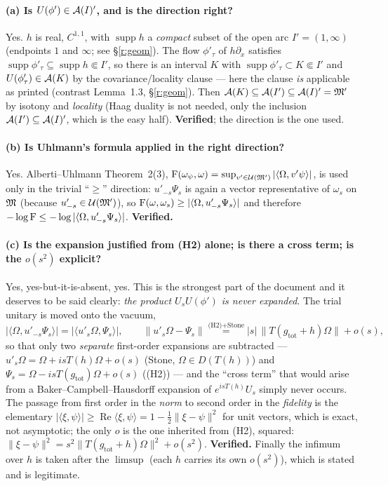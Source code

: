 \documentclass[11pt]{article}
\newcommand{\U}{\mathcal U}
\newcommand{\ip}[2]{\langle#1,#2\rangle}
\newcommand{\norm}[1]{\lVert#1\rVert}
\newcommand{\supp}{\operatorname{supp}}
\newcommand{\Om}{\Omega}
\newcommand{\gtot}{g_{\mathrm{tot}}}
\begin{document}
\paragraph{(a) Is $U(\phi')\in\mathcal A(I)'$, and is the direction right?}  Yes.  $h$ is real, $C^{1,1}$, with
$\supp h$ a \emph{compact} subset of the open arc $I'=(1,\infty)$ (endpoints $1$ and $\infty$; see
\S\ref{r:geom}).  The flow $\phi'_\tau$ of $h\partial_x$ satisfies
$\supp\phi'_\tau\subseteq\supp h\Subset I'$, so there is an interval $K$ with $\supp\phi'_\tau\subset K\Subset
I'$ and $U(\phi'_\tau)\in\mathcal A(K)$ by the covariance/locality clause --- here the clause \emph{is} applicable
as printed (contrast Lemma~1.3, \S\ref{r:geom}).  Then $\mathcal A(K)\subseteq\mathcal A(I')\subseteq\mathcal A(I)'=\mathfrak M'$ by
isotony and \emph{locality} (Haag duality is not needed, only the inclusion
$\mathcal A(I')\subseteq\mathcal A(I)'$, which is the easy half).  \textbf{Verified}; the direction is the one used.

\paragraph{(b) Is Uhlmann's formula applied in the right direction?}  Yes.  Alberti--Uhlmann Theorem~2(3),
$\Fid(\omega_\psi,\omega)=\sup_{v'\in\U(\cM')}|\ip\Om{v'\psi}|$, is used only in the trivial ``$\ge$''
direction: $u'_{-s}\Psi_s$ is again a vector representative of $\omega_s$ on $\mathfrak M$ (because
$u'_{-s}\in\U(\cM')$), so $\Fid(\omega,\omega_s)\ge|\ip\Om{u'_{-s}\Psi_s}|$ and therefore
$-\log\Fid\le-\log|\ip\Om{u'_{-s}\Psi_s}|$.  \textbf{Verified.}

\paragraph{(c) Is the expansion justified from (H2) alone; is there a cross term; is the $o(s^2)$ explicit?}
Yes, yes-but-it-is-absent, yes.  This is the strongest part of the document and it deserves to be said
clearly: \emph{the product $U_sU(\phi')$ is never expanded}.  The trial unitary is moved onto the vacuum,
\[
 \bigl|\ip\Om{u'_{-s}\Psi_s}\bigr|=\bigl|\ip{u'_s\Om}{\Psi_s}\bigr|,\qquad
 \norm{u'_s\Om-\Psi_s}\overset{\text{(H2)}+\text{Stone}}{=}|s|\,\norm{T(\gtot+h)\Om}+o(s),
\]
so that only two \emph{separate} first-order expansions are subtracted --- $u'_s\Om=\Om+isT(h)\Om+o(s)$
(Stone, $\Om\in D(T(h))$) and $\Psi_s=\Om-isT(\gtot)\Om+o(s)$ ((H2)) --- and the ``cross term'' that would
arise from a Baker--Campbell--Hausdorff expansion of $e^{isT(h)}U_s$ simply never occurs.  The passage from
first order in the \emph{norm} to second order in the \emph{fidelity} is the elementary
$|\ip\xi\psi|\ge\operatorname{Re}\ip\xi\psi=1-\frac12\norm{\xi-\psi}^2$ for unit vectors, which is exact,
not asymptotic; the only $o$ is the one inherited from (H2), squared:
$\norm{\xi-\psi}^2=s^2\norm{T(\gtot+h)\Om}^2+o(s^2)$.  \textbf{Verified.}  Finally the infimum over $h$ is
taken after the $\limsup$ (each $h$ carries its own $o(s^2)$), which is stated and is legitimate.
\end{document}
